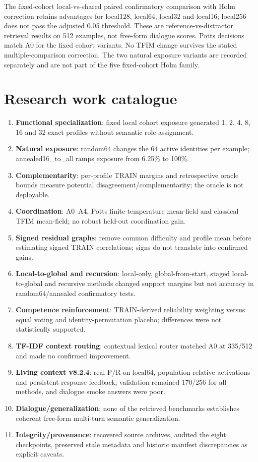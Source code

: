 \documentclass[11pt,a4paper]{report}
\begin{document}
The fixed-cohort local-vs-shared paired confirmatory comparison with Holm correction retains advantages for local128, local64, local32 and local16; local256 does not pass the adjusted 0.05 threshold. These are reference-vs-distractor retrieval results on 512 examples, not free-form dialogue scores. Potts decisions match A0 for the fixed cohort variants. No TFIM change survives the stated multiple-comparison correction. The two natural exposure variants are recorded separately and are not part of the five fixed-cohort Holm family.

\section{Research work catalogue}
\begin{enumerate}
\item \textbf{Functional specialization}: fixed local cohort exposure generated 1, 2, 4, 8, 16 and 32 exact profiles without semantic role assignment.
\item \textbf{Natural exposure}: random64 changes the 64 active identities per example; annealed16\_to\_all ramps exposure from 6.25\% to 100\%.
\item \textbf{Complementarity}: per-profile TRAIN margins and retrospective oracle bounds measure potential disagreement/complementarity; the oracle is not deployable.
\item \textbf{Coordination}: A0--A4, Potts finite-temperature mean-field and classical TFIM mean-field; no robust held-out coordination gain.
\item \textbf{Signed residual graphs}: remove common difficulty and profile mean before estimating signed TRAIN correlations; signs do not translate into confirmed gains.
\item \textbf{Local-to-global and recursion}: local-only, global-from-start, staged local-to-global and recursive methods changed support margins but not accuracy in random64/annealed confirmatory tests.
\item \textbf{Competence reinforcement}: TRAIN-derived reliability weighting versus equal voting and identity-permutation placebo; differences were not statistically supported.
\item \textbf{TF-IDF context routing}: contextual lexical router matched A0 at 335/512 and made no confirmed improvement.
\item \textbf{Living context v8.2.4}: real P/R on local64, population-relative activations and persistent response feedback; validation remained 170/256 for all methods, and dialogue smoke answers were poor.
\item \textbf{Dialogue/generalization}: none of the retrieved benchmarks establishes coherent free-form multi-turn semantic generalization.
\item \textbf{Integrity/provenance}: recovered source archives, audited the eight checkpoints, preserved stale metadata and historic manifest discrepancies as explicit caveats.
\end{enumerate}
\end{document}
